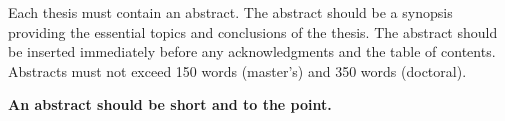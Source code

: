 Each thesis must contain an abstract. The abstract should be a synopsis providing the essential topics and conclusions of the thesis. The abstract should be inserted immediately before any acknowledgments and the table of contents. Abstracts must not exceed 150 words (master’s) and 350 words (doctoral).

\textbf{An abstract should be short and to the point.}
